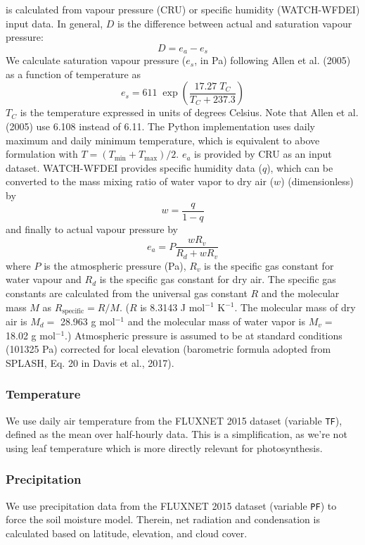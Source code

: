 \documentclass{myreport}
\begin{document}
is calculated from vapour pressure (CRU) or specific humidity (WATCH-WFDEI) input data. In general, $D$ is the difference between actual and saturation vapour pressure:
\begin{equation}
    D = e_a - e_s
\end{equation}
We calculate saturation vapour pressure ($e_s$, in Pa) following Allen et al. (2005) as a function of temperature  as
\begin{equation}
e_s = 611 \; \exp \left( {\frac{17.27\;T_C}{T_C+237.3}} \right)
\end{equation}
$T_C$ is the temperature expressed in units of degrees Celsius. Note that Allen et al. (2005) use 6.108 instead of 6.11. The Python implementation uses daily maximum and daily minimum temperature, which is equivalent to above formulation with $T=(T_{\text{min}}+T_{\text{max}})/2$. $e_a$ is provided by CRU as an input dataset. WATCH-WFDEI provides specific humidity data ($q$), which can be converted to the mass mixing ratio of water vapor to dry air ($w$) (dimensionless) by
\begin{equation}
    w = \frac{q}{1-q}
\end{equation}
and finally to actual vapour pressure by
\begin{equation}
    e_a = P \frac{w R_v}{R_d + w R_v}
\end{equation}
where $P$ is the atmospheric pressure (Pa), $R_v$ is the specific gas constant for water vapour and $R_d$ is the specific gas constant for dry air. The specific gas constants are calculated from the universal gas constant $R$ and the molecular mass $M$ as $R_{\text{specific}}=R/M$. ($R$ is 8.3143 J mol$^{-1}$ K$^{-1}$. The molecular mass of dry air is $M_d=$ 28.963 g mol$^{-1}$ and the molecular mass of water vapor is $M_v=$ 18.02 g mol$^{-1}$.) Atmospheric pressure is assumed to be at standard conditions (101325 Pa) corrected for local elevation (barometric formula adopted from SPLASH, Eq. 20 in Davis et al., 2017).

\subsubsection{Temperature}
\label{sec:temperature}
We use daily air temperature from the FLUXNET 2015 dataset (variable \texttt{T\textunderscore F}), defined as the mean over half-hourly data. This is a simplification, as we're not using leaf temperature which is more directly relevant for photosynthesis.

\subsubsection{Precipitation}
\label{sec:precipitation}
We use precipitation data from the FLUXNET 2015 dataset (variable \texttt{P\textunderscore F}) to force the soil moisture model. Therein, net radiation and condensation is calculated based on latitude, elevation, and cloud cover.
\end{document}
